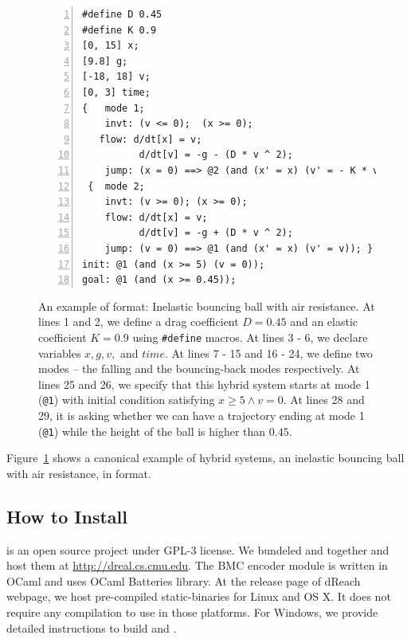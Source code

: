 \begin{figure}
  \centering
  \begin{Verbatim}[fontfamily=courier, frame=single, framesep=1mm,
  numbers=left, fontsize=\scriptsize]
#define D 0.45
#define K 0.9
[0, 15] x;
[9.8] g;
[-18, 18] v;
[0, 3] time;
{   mode 1;
    invt: (v <= 0);  (x >= 0);
   flow: d/dt[x] = v;
          d/dt[v] = -g - (D * v ^ 2);
    jump: (x = 0) ==> @2 (and (x' = x) (v' = - K * v)); }
 {  mode 2;
    invt: (v >= 0); (x >= 0);
    flow: d/dt[x] = v;
          d/dt[v] = -g + (D * v ^ 2);
    jump: (v = 0) ==> @1 (and (x' = x) (v' = v)); }
init: @1 (and (x >= 5) (v = 0));
goal: @1 (and (x >= 0.45));
\end{Verbatim}
\caption{An example of \drh{} format: Inelastic bouncing ball with air
  resistance. At lines 1 and 2, we define a drag coefficient $D = 0.45$
  and an elastic coefficient $K = 0.9$ using \texttt{\#define} macros.
  At lines 3 - 6, we declare variables $x, g, v,$ and $time$. At lines
  7 - 15 and 16 - 24, we define two modes -- the falling and the
  bouncing-back modes respectively. At lines 25 and 26, we specify
  that this hybrid system starts at mode 1 (\texttt{@1}) with initial
  condition satisfying $x \ge 5 \land v = 0$. At lines 28 and 29, it
  is asking whether we can have a trajectory ending at mode 1
  (\texttt{@1}) while the height of the ball is higher than $0.45$.}
\label{fig:bouncing-ball-drh}
\end{figure}

Figure~\ref{fig:bouncing-ball-drh} shows a canonical example of hybrid
systems, an inelastic bouncing ball with air resistance, in \drh{}
format.

\subsection{How to Install}
\dReach{} is an open source project under GPL-3 license. We bundeled
\dReal{} and \dReach{} together and host them at
\url{http://dreal.cs.cmu.edu}. The BMC encoder module is written in
OCaml and uses OCaml Batteries library. At the release page of dReach
webpage, we host pre-compiled static-binaries for Linux and OS X. It
does not require any compilation to use \dReach{} in those
platforms. For Windows, we provide detailed instructions to build
\dReach{} and \dReal{}.

